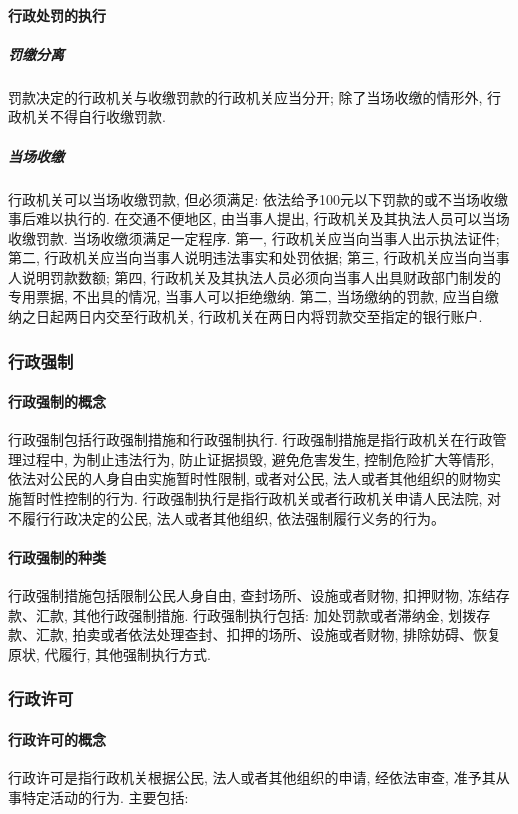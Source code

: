 \paragraph{行政处罚的执行}

\subparagraph{罚缴分离} 罚款决定的行政机关与收缴罚款的行政机关应当分开; 除了当场收缴的情形外, 行政机关不得自行收缴罚款.

\subparagraph{当场收缴} 行政机关可以当场收缴罚款, 但必须满足: 依法给予100元以下罚款的或不当场收缴事后难以执行的. 在交通不便地区, 由当事人提出, 行政机关及其执法人员可以当场收缴罚款. 当场收缴须满足一定程序. 第一, 行政机关应当向当事人出示执法证件; 第二, 行政机关应当向当事人说明违法事实和处罚依据; 第三, 行政机关应当向当事人说明罚款数额; 第四, 行政机关及其执法人员必须向当事人出具财政部门制发的专用票据, 不出具的情况, 当事人可以拒绝缴纳. 第二, 当场缴纳的罚款, 应当自缴纳之日起两日内交至行政机关, 行政机关在两日内将罚款交至指定的银行账户.

\subsubsection{行政强制}

\paragraph{行政强制的概念} 行政强制包括行政强制措施和行政强制执行. 行政强制措施是指行政机关在行政管理过程中, 为制止违法行为, 防止证据损毁, 避免危害发生, 控制危险扩大等情形, 依法对公民的人身自由实施暂时性限制, 或者对公民, 法人或者其他组织的财物实施暂时性控制的行为. 行政强制执行是指行政机关或者行政机关申请人民法院, 对不履行行政决定的公民, 法人或者其他组织, 依法强制履行义务的行为。

\paragraph{行政强制的种类} 行政强制措施包括限制公民人身自由, 查封场所、设施或者财物, 扣押财物, 冻结存款、汇款, 其他行政强制措施. 行政强制执行包括: 加处罚款或者滞纳金, 划拨存款、汇款, 拍卖或者依法处理查封、扣押的场所、设施或者财物, 排除妨碍、恢复原状, 代履行, 其他强制执行方式.

\subsubsection{行政许可}

\paragraph{行政许可的概念} 行政许可是指行政机关根据公民, 法人或者其他组织的申请, 经依法审查, 准予其从事特定活动的行为. 主要包括:

